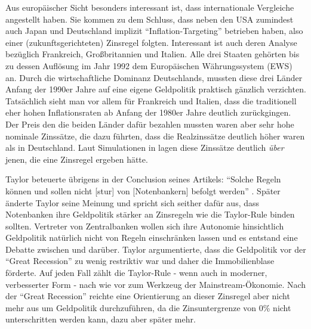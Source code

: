 Aus europäischer Sicht besonders interessant ist, dass \textcite{Gali1998} internationale Vergleiche angestellt haben. Sie kommen zu dem Schluss, dass neben den USA zumindest auch Japan und Deutschland implizit "`Inflation-Targeting"' betrieben haben, also einer (zukunftsgerichteten) Zinsregel folgten. Interessant ist auch deren Analyse bezüglich Frankreich, Großbritannien und Italien. Alle drei Staaten gehörten bis zu dessen Auflösung im Jahr 1992 dem Europäischen Währungssystem (EWS) an. Durch die wirtschaftliche Dominanz Deutschlands, mussten diese drei Länder Anfang der 1990er Jahre auf eine eigene Geldpolitik praktisch gänzlich verzichten. Tatsächlich sieht man vor allem für Frankreich und Italien, dass die traditionell eher hohen Inflationsraten ab Anfang der 1980er Jahre deutlich zurückgingen. Der Preis den die beiden Länder dafür bezahlen mussten waren aber sehr hohe nominale Zinssätze, die dazu führten, dass die Realzinssätze deutlich höher waren als in Deutschland. Laut Simulationen in \textcite[S. 23f]{Gali1998} lagen diese Zinssätze deutlich \textit{über} jenen, die eine Zinsregel ergeben hätte.

Taylor beteuerte übrigens in der Conclusion seines Artikels: "`Solche Regeln können und sollen nicht [stur] von [Notenbankern] befolgt werden"' \parencite[S. 213]{Taylor1993}. Später änderte Taylor seine Meinung und spricht sich seither dafür aus, dass Notenbanken ihre Geldpolitik stärker an Zinsregeln wie die Taylor-Rule binden sollten. Vertreter von Zentralbanken wollen sich ihre Autonomie hinsichtlich Geldpolitik natürlich nicht von Regeln einschränken lassen \parencite[S. 609]{Romer2019} und es entstand eine Debatte zwischen \textcite{Bernanke2015} und \textcite{Taylor2015} darüber. Taylor argumentierte, dass die Geldpolitik vor der "`Great Recession"' zu wenig restriktiv war und daher die Immobilienblase förderte. Auf jeden Fall zählt die Taylor-Rule - wenn auch in moderner, verbesserter Form - nach wie vor zum Werkzeug der Mainstream-Ökonomie. Nach der "`Great Recession"' reichte eine Orientierung an dieser Zinsregel aber nicht mehr aus um Geldpolitik durchzuführen, da die Zinsuntergrenze von 0\% nicht unterschritten werden kann, dazu aber später mehr.

